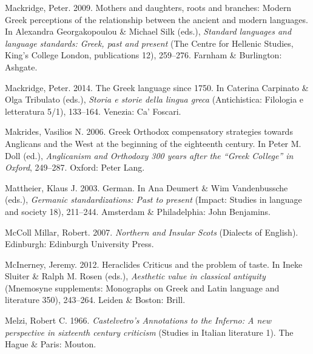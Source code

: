 \begin{styleStandard}
Mackridge, Peter. 2009. Mothers and daughters, roots and branches: Modern Greek perceptions of the relationship between the ancient and modern languages. In Alexandra Georgakopoulou \& Michael Silk (eds.), \textit{Standard languages and language standards: Greek, past and present} (The Centre for Hellenic Studies, King’s College London, publications 12), 259–276. Farnham \& Burlington: Ashgate.
\end{styleStandard}

\begin{styleStandard}
Mackridge, Peter. 2014. The Greek language since 1750. In Caterina Carpinato \& Olga Tribulato (eds.), \textit{Storia e storie della lingua greca} (Antichistica: Filologia e letteratura 5/1), 133–164. Venezia: Ca’ Foscari.
\end{styleStandard}

\begin{styleStandard}
Makrides, Vasilios N. 2006. Greek Orthodox compensatory strategies towards Anglicans and the West at the beginning of the eighteenth century. In Peter M. Doll (ed.), \textit{Anglicanism and Orthodoxy 300 years after the “Greek College” in Oxford}, 249–287. Oxford: Peter Lang.
\end{styleStandard}

\begin{styleStandard}
Mattheier, Klaus J. 2003. German. In Ana Deumert \& Wim Vandenbussche (eds.), \textit{Germanic standardizations: Past to present} (Impact: Studies in language and society 18), 211–244. Amsterdam \& Philadelphia: John Benjamins.
\end{styleStandard}

\begin{styleStandard}
McColl Millar, Robert. 2007. \textit{Northern and Insular Scots} (Dialects of English). Edinburgh: Edinburgh University Press.
\end{styleStandard}

\begin{styleStandard}
McInerney, Jeremy. 2012. Heraclides Criticus and the problem of taste. In Ineke Sluiter \& Ralph M. Rosen (eds.), \textit{Aesthetic value in classical antiquity} (Mnemosyne supplements: Monographs on Greek and Latin language and literature 350), 243–264. Leiden \& Boston: Brill.
\end{styleStandard}

\begin{styleStandard}
Melzi, Robert C. 1966. \textit{Castelvetro’s Annotations to the Inferno: A new perspective in sixteenth century criticism} (Studies in Italian literature 1). The Hague \& Paris: Mouton.
\end{styleStandard}


